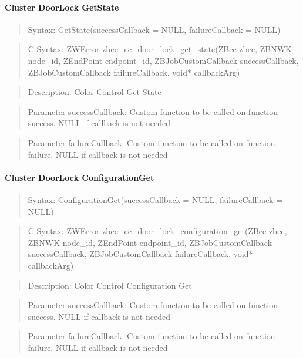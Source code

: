 \paragraph{Cluster DoorLock GetState}
\begin{quote}Syntax: GetState(successCallback = NULL, failureCallback = NULL)\end{quote}
\begin{quote}C Syntax: ZWError zbee\_cc\_door\_lock\_get\_state(ZBee zbee, ZBNWK node\_id, ZEndPoint endpoint\_id, ZBJobCustomCallback successCallback, ZBJobCustomCallback failureCallback, void* callbackArg)\end{quote}
\begin{quote}Description: Color Control Get State\end{quote}
\begin{quote}Parameter successCallback: Custom function to be called on function success. NULL if callback is not needed\end{quote}
\begin{quote}Parameter failureCallback: Custom function to be called on function failure. NULL if callback is not needed\end{quote}


\paragraph{Cluster DoorLock ConfigurationGet}
\begin{quote}Syntax: ConfigurationGet(successCallback = NULL, failureCallback = NULL)\end{quote}
\begin{quote}C Syntax: ZWError zbee\_cc\_door\_lock\_configuration\_get(ZBee zbee, ZBNWK node\_id, ZEndPoint endpoint\_id, ZBJobCustomCallback successCallback, ZBJobCustomCallback failureCallback, void* callbackArg)\end{quote}
\begin{quote}Description: Color Control Configuration Get\end{quote}
\begin{quote}Parameter successCallback: Custom function to be called on function success. NULL if callback is not needed\end{quote}
\begin{quote}Parameter failureCallback: Custom function to be called on function failure. NULL if callback is not needed\end{quote}



